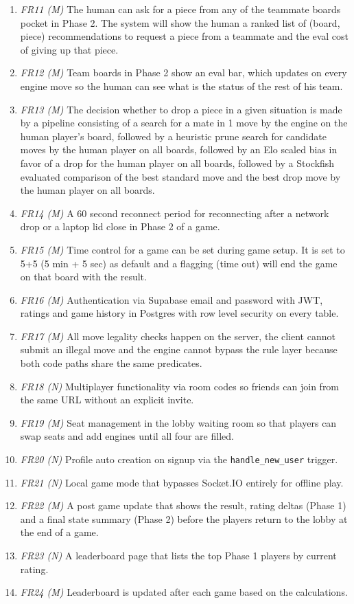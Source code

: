 \documentclass[11pt,a4paper]{article}
\begin{document}
\begin{enumerate}[leftmargin=*]
\item \textit{FR11 (M)} The human can ask for a piece from any of the teammate boards pocket in Phase 2. The system will show the human a ranked list of (board, piece) recommendations to request a piece from a teammate and the eval cost of giving up that piece.
\item \textit{FR12 (M)} Team boards in Phase 2 show an eval bar, which updates on every engine move so the human can see what is the status of the rest of his team.
\item \textit{FR13 (M)} The decision whether to drop a piece in a given situation is made by a pipeline consisting of a search for a mate in 1 move by the engine on the human player’s board, followed by a heuristic prune search for candidate moves by the human player on all boards, followed by an Elo scaled bias in favor of a drop for the human player on all boards, followed by a Stockfish evaluated comparison of the best standard move and the best drop move by the human player on all boards.
\item \textit{FR14 (M)} A 60 second reconnect period for reconnecting after a network drop or a laptop lid close in Phase 2 of a game.
\item \textit{FR15 (M)} Time control for a game can be set during game setup. It is set to 5+5 (5 min + 5 sec) as default and a flagging (time out) will end the game on that board with the result.
\item \textit{FR16 (M)} Authentication via Supabase email and password with JWT, ratings and game history in Postgres with row level security on every table.
\item \textit{FR17 (M)} All move legality checks happen on the server, the client cannot submit an illegal move and the engine cannot bypass the rule layer because both code paths share the same predicates.
\item \textit{FR18 (N)} Multiplayer functionality via room codes so friends can join from the same URL without an explicit invite.
\item \textit{FR19 (M)} Seat management in the lobby waiting room so that players can swap seats and add engines until all four are filled.
\item \textit{FR20 (N)} Profile auto creation on signup via the \texttt{handle\_new\_user} trigger.
\item \textit{FR21 (N)} Local game mode that bypasses Socket.IO entirely for offline play.
\item \textit{FR22 (M)} A post game update that shows the result, rating deltas (Phase 1) and a final state summary (Phase 2) before the players return to the lobby at the end of a game.
\item \textit{FR23 (N)} A leaderboard page that lists the top Phase 1 players by current rating.
\item \textit{FR24 (M)} Leaderboard is updated after each game based on the calculations.
\end{enumerate}
\end{document}
